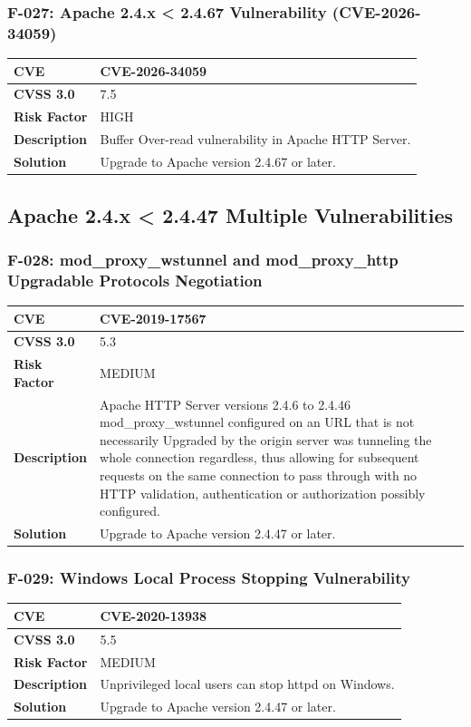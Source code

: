\subsubsection{F-027: Apache 2.4.x < 2.4.67 Vulnerability (CVE-2026-34059)}
\begin{tabular}{|p{2.8cm}|p{12.2cm}|}
\hline
\textbf{CVE} & CVE-2026-34059 \\ \hline
\textbf{CVSS 3.0} & 7.5 \\ \hline
\textbf{Risk Factor} & HIGH \\ \hline
\textbf{Description} & Buffer Over-read vulnerability in Apache HTTP Server. \\ \hline
\textbf{Solution} & Upgrade to Apache version 2.4.67 or later. \\ \hline
\end{tabular}

%
%
\subsection{Apache 2.4.x < 2.4.47 Multiple Vulnerabilities}

\subsubsection{F-028: mod\_proxy\_wstunnel and mod\_proxy\_http Upgradable Protocols Negotiation}
\begin{tabular}{|p{2.8cm}|p{12.2cm}|}
\hline
\textbf{CVE} & CVE-2019-17567 \\ \hline
\textbf{CVSS 3.0} & 5.3 \\ \hline
\textbf{Risk Factor} & MEDIUM \\ \hline
\textbf{Description} & Apache HTTP Server versions 2.4.6 to 2.4.46 mod\_proxy\_wstunnel configured on an URL that is not necessarily Upgraded by the origin server was tunneling the whole connection regardless, thus allowing for subsequent requests on the same connection to pass through with no HTTP validation, authentication or authorization possibly configured. \\ \hline
\textbf{Solution} & Upgrade to Apache version 2.4.47 or later. \\ \hline
\end{tabular}

\subsubsection{F-029: Windows Local Process Stopping Vulnerability}
\begin{tabular}{|p{2.8cm}|p{12.2cm}|}
\hline
\textbf{CVE} & CVE-2020-13938 \\ \hline
\textbf{CVSS 3.0} & 5.5 \\ \hline
\textbf{Risk Factor} & MEDIUM \\ \hline
\textbf{Description} & Unprivileged local users can stop httpd on Windows. \\ \hline
\textbf{Solution} & Upgrade to Apache version 2.4.47 or later. \\ \hline
\end{tabular}

